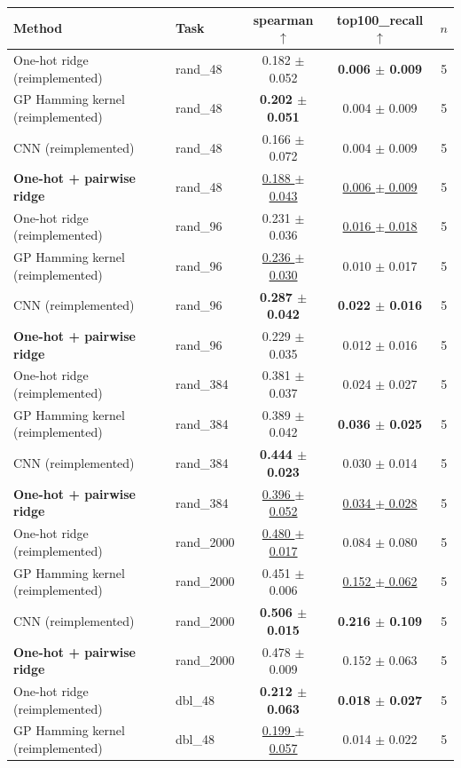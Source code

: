 \begin{tabular}{llccc}
\toprule
Method & Task & spearman $\uparrow$ & top100\_recall $\uparrow$ & $n$ \\
\midrule
One-hot ridge (reimplemented) & rand\_48 & 0.182 $\pm$ 0.052 & \textbf{0.006 $\pm$ 0.009} & 5 \\
GP Hamming kernel (reimplemented) & rand\_48 & \textbf{0.202 $\pm$ 0.051} & 0.004 $\pm$ 0.009 & 5 \\
CNN (reimplemented) & rand\_48 & 0.166 $\pm$ 0.072 & 0.004 $\pm$ 0.009 & 5 \\
\textbf{One-hot + pairwise ridge} & rand\_48 & \underline{0.188 $\pm$ 0.043} & \underline{0.006 $\pm$ 0.009} & 5 \\
\midrule
One-hot ridge (reimplemented) & rand\_96 & 0.231 $\pm$ 0.036 & \underline{0.016 $\pm$ 0.018} & 5 \\
GP Hamming kernel (reimplemented) & rand\_96 & \underline{0.236 $\pm$ 0.030} & 0.010 $\pm$ 0.017 & 5 \\
CNN (reimplemented) & rand\_96 & \textbf{0.287 $\pm$ 0.042} & \textbf{0.022 $\pm$ 0.016} & 5 \\
\textbf{One-hot + pairwise ridge} & rand\_96 & 0.229 $\pm$ 0.035 & 0.012 $\pm$ 0.016 & 5 \\
\midrule
One-hot ridge (reimplemented) & rand\_384 & 0.381 $\pm$ 0.037 & 0.024 $\pm$ 0.027 & 5 \\
GP Hamming kernel (reimplemented) & rand\_384 & 0.389 $\pm$ 0.042 & \textbf{0.036 $\pm$ 0.025} & 5 \\
CNN (reimplemented) & rand\_384 & \textbf{0.444 $\pm$ 0.023} & 0.030 $\pm$ 0.014 & 5 \\
\textbf{One-hot + pairwise ridge} & rand\_384 & \underline{0.396 $\pm$ 0.052} & \underline{0.034 $\pm$ 0.028} & 5 \\
\midrule
One-hot ridge (reimplemented) & rand\_2000 & \underline{0.480 $\pm$ 0.017} & 0.084 $\pm$ 0.080 & 5 \\
GP Hamming kernel (reimplemented) & rand\_2000 & 0.451 $\pm$ 0.006 & \underline{0.152 $\pm$ 0.062} & 5 \\
CNN (reimplemented) & rand\_2000 & \textbf{0.506 $\pm$ 0.015} & \textbf{0.216 $\pm$ 0.109} & 5 \\
\textbf{One-hot + pairwise ridge} & rand\_2000 & 0.478 $\pm$ 0.009 & 0.152 $\pm$ 0.063 & 5 \\
\midrule
One-hot ridge (reimplemented) & dbl\_48 & \textbf{0.212 $\pm$ 0.063} & \textbf{0.018 $\pm$ 0.027} & 5 \\
GP Hamming kernel (reimplemented) & dbl\_48 & \underline{0.199 $\pm$ 0.057} & 0.014 $\pm$ 0.022 & 5 \\

\end{tabular}
